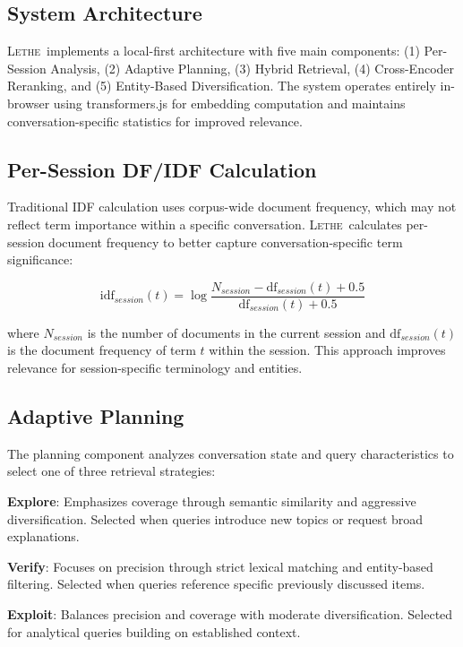 \documentclass[letterpaper]{article}
\newcommand{\lethe}{\textsc{Lethe}}
\begin{document}
\subsection{System Architecture}

\lethe\ implements a local-first architecture with five main components: (1) Per-Session Analysis, (2) Adaptive Planning, (3) Hybrid Retrieval, (4) Cross-Encoder Reranking, and (5) Entity-Based Diversification. The system operates entirely in-browser using transformers.js for embedding computation and maintains conversation-specific statistics for improved relevance.

\subsection{Per-Session DF/IDF Calculation}

Traditional IDF calculation uses corpus-wide document frequency, which may not reflect term importance within a specific conversation. \lethe\ calculates per-session document frequency to better capture conversation-specific term significance:

\begin{equation}
\text{idf}_{session}(t) = \log \frac{N_{session} - \text{df}_{session}(t) + 0.5}{\text{df}_{session}(t) + 0.5}
\end{equation}

where $N_{session}$ is the number of documents in the current session and $\text{df}_{session}(t)$ is the document frequency of term $t$ within the session. This approach improves relevance for session-specific terminology and entities.

\subsection{Adaptive Planning}

The planning component analyzes conversation state and query characteristics to select one of three retrieval strategies:

\textbf{Explore}: Emphasizes coverage through semantic similarity and aggressive diversification. Selected when queries introduce new topics or request broad explanations.

\textbf{Verify}: Focuses on precision through strict lexical matching and entity-based filtering. Selected when queries reference specific previously discussed items.

\textbf{Exploit}: Balances precision and coverage with moderate diversification. Selected for analytical queries building on established context.
\end{document}
